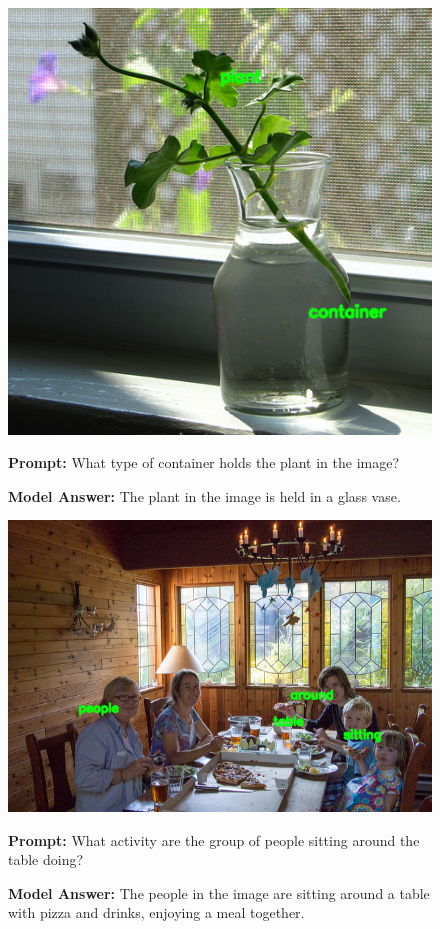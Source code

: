 \documentclass[11pt]{article}
\begin{document}
\begin{figure}[H]
    \centering
    \includegraphics[width=0.5\linewidth]{reordering_301.png}\par
    \vspace{1em}
    \raggedright
    \textbf{Prompt:} What type of container holds the plant in the image?
    
    \textbf{Model Answer:} The plant in the image is held in a glass vase.
\end{figure}

\begin{figure}[H]
    \centering
    \includegraphics[width=0.6\linewidth]{reordering_52.png}\par
    \vspace{1em}
    \raggedright
    \textbf{Prompt:} What activity are the group of people sitting around the table doing?

    \textbf{Model Answer:} The people in the image are sitting around a table with pizza and drinks, enjoying a meal together.
\end{figure}
\end{document}
